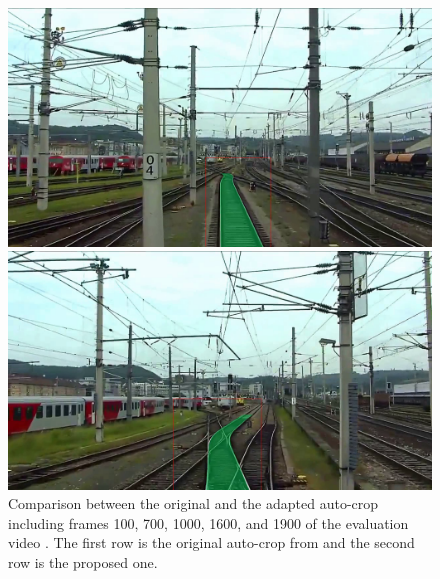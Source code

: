 \begin{figure}[H]
\begin{minipage}{0.195\textwidth}
    \end{minipage}
    \hfill
    \begin{minipage}{0.195\textwidth}
        \includegraphics[width=\textwidth]{PICs/experiments/autocropExperiments/output_frames_improved/frame_1600.png}
    \end{minipage}
    \hfill
    \begin{minipage}{0.195\textwidth}
        \includegraphics[width=\textwidth]{PICs/experiments/autocropExperiments/output_frames_improved/frame_1900.png}
    \end{minipage}

    \begin{minipage}{1.0\textwidth}
        \centering
    \end{minipage}

    \vspace{0.5cm}
    \caption{Comparison between the original and the adapted auto-crop including frames 100, 700, 1000, 1600, and 1900 of the evaluation video \cite{temporalDataset_youtube_video}.
    The first row is the original auto-crop from \cite{tepNet2024} and the second row is the proposed one.}
    \label{fig:autocropVideoComparison}
\end{figure}

